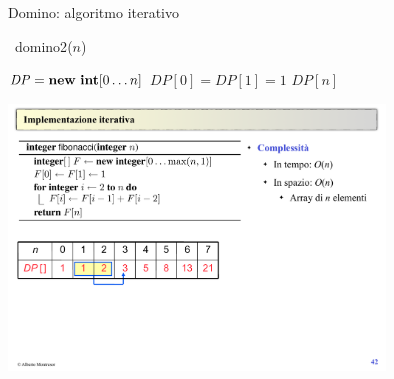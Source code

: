 \begin{frame}[fragile]{Domino: algoritmo iterativo}

\vspace{-9pt}

\begin{Procedure}
\caption[A]{\INTEGER\ \textsf{domino2}(\INTEGER $n$)}
  $\mathit{DP} = \NEW\ \INTEGER[0 \ldots n]$\;
  $\mathit{DP}[0] = \mathit{DP}[1] = 1$\;
  \Return $\mathit{DP}[n]$\;
\end{Procedure}

\begin{center}
\includegraphics[width=0.75\textwidth]{fib-table1.pdf}
\end{center}

\end{frame}



